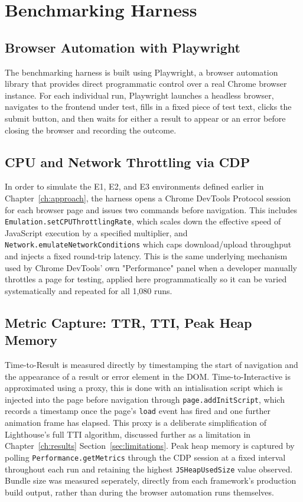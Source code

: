 \documentclass[11pt,a4paper]{report}
\begin{document}
\section{Benchmarking Harness}

\subsection{Browser Automation with Playwright}

The benchmarking harness is built using Playwright, a browser automation library that provides direct programmatic control over a real Chrome browser instance. For each individual run, Playwright launches a headless browser, navigates to the frontend under test, fills in a fixed piece of test text, clicks the submit button, and then waits for either a result to appear or an error before closing the browser and recording the outcome.

\subsection{CPU and Network Throttling via CDP}

In order to simulate the E1, E2, and E3 environments defined earlier in Chapter~\ref{ch:approach}, the harness opens a Chrome DevTools Protocol session for each browser page and issues two commands before navigation. This includes \texttt{Emulation.setCPUThrottlingRate}, which scales down the effective speed of JavaScript execution by a specified multiplier, and \texttt{Network.emulateNetworkConditions} which caps download/upload throughput and injects a fixed round-trip latency. This is the same underlying mechanism used by Chrome DevTools' own "Performance" panel when a developer manually throttles a page for testing, applied here programmatically so it can be varied systematically and repeated for all 1,080 runs.

\subsection{Metric Capture: TTR, TTI, Peak Heap Memory}

Time-to-Result is measured directly by timestamping the start of navigation and the appearance of a result or error element in the DOM. Time-to-Interactive is approximated using a proxy, this is done with an intialisation script which is injected into the page before navigation through \texttt{page.addInitScript}, which records a timestamp once the page's \texttt{load} event has fired and one further animation frame has elapsed. This proxy is a deliberate simplification of Lighthouse's full TTI algorithm, discussed further as a limitation in Chapter~\ref{ch:results} Section~\ref{sec:limitations}. Peak heap memory is captured by polling \texttt{Performance.getMetrics} 
through the CDP session at a fixed interval throughout each run and retaining the highest \texttt{JSHeapUsedSize} value observed. Bundle size was measured seperately, directly from each framework's production build output, rather than during the browser automation runs themselves. 
\end{document}

